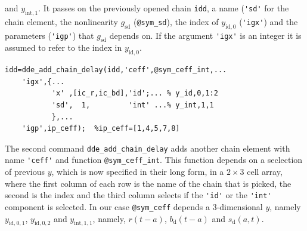 \documentclass[10pt]{scrartcl}
\newcommand{\blist}[1]{\mbox{\lstinline!#1!}}
\begin{document}
and $y_{\mathrm{int},1}$. It passes on the previously opened chain
\blist{idd}, a name (\blist{'sd'} for the chain element, the
nonlinearity $g_\mathrm{sd}$ (\blist{@sym_sd}), the index of
$y_{\mathrm{id},0}$ (\blist{'igx'}) and the parameters (\blist{'igp'})
that $g_\mathrm{sd}$ depends on. If the argument \blist{'igx'} is an
integer it is assumed to refer to the index in
$y_{\mathrm{id},0}$.
\begin{lstlisting}
idd=dde_add_chain_delay(idd,'ceff',@sym_ceff_int,...
    'igx',{...
           'x' ,[ic_r,ic_bd],'id';... % y_id,0,1:2
           'sd',  1,         'int' ...% y_int,1,1
           },...
    'igp',ip_ceff);  %ip_ceff=[1,4,5,7,8]  
\end{lstlisting}
The second command \blist{dde_add_chain_delay} adds another chain
element with name \blist{'ceff'} and function
\blist{@sym_ceff_int}. This function depends on a seclection of
previous $y$, which is now specified in their long form, in a
$2\times3$ cell array, where the first column of each row is the name
of the chain that is picked, the second is the index and the third
column selects if the \blist{'id'} or the \blist{'int'} component is
selected. In our case \blist{@sym_ceff} depends a $3$-dimensional
$y$, namely $y_{\mathrm{id},0,1}$, $y_{\mathrm{id},0,2}$ and $y_{\mathrm{int},1,1}$, namely, $r(t-a)$, $b_\mathrm{d}(t-a)$ and $s_\mathrm{d}(a,t)$.
\end{document}
